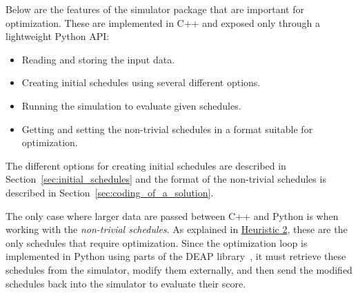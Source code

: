Below are the features of the simulator package that are important for optimization. These are implemented in C++ and exposed only through a lightweight Python API:
\begin{itemize}
    \item Reading and storing the input data.
    \item Creating initial schedules using several different options.
    \item Running the simulation to evaluate given schedules.
    \item Getting and setting the non-trivial schedules in a format suitable for optimization.
\end{itemize}
The different options for creating initial schedules are described in Section~\ref{sec:initial_schedules} and the format of the non-trivial schedules is described in Section~\ref{sec:coding_of_a_solution}.


The only case where larger data are passed between C++ and Python is when working with the \textit{non-trivial schedules}.
As explained in \hyperref[para:heuristic_2]{Heuristic 2}, these are the only schedules that require optimization.
Since the optimization loop is implemented in Python using parts of the DEAP library~\cite{fortin2012deap}, it must retrieve these schedules from the simulator, modify them externally, and then send the modified schedules back into the simulator to evaluate their score.
